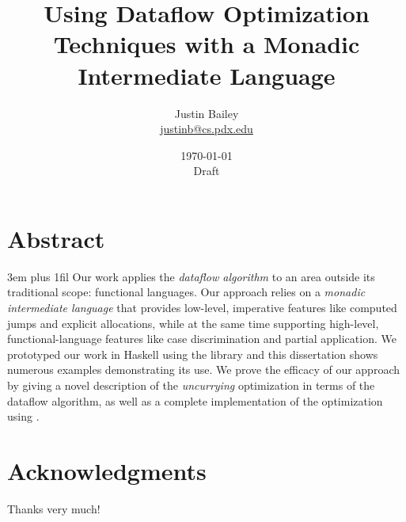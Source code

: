 \dodocclass



\date{\today \\Draft}
\author{Justin Bailey \\ \url{justinb@cs.pdx.edu}}
\title{Using Dataflow Optimization Techniques with a Monadic Intermediate Language}
\maketitle 

\pagestyle{plain}
\section*{Abstract}
{%
\parfillskip 3em plus 1fil%
Our work applies the \emph{dataflow algorithm} to an area outside its
traditional scope: functional languages. Our approach relies on
a \emph{monadic intermediate language} that provides low-level,
imperative features like computed jumps and explicit allocations,
while at the same time supporting high-level, functional-language
features like case discrimination and partial application. We
prototyped our work in Haskell using the \hoopl library and this
dissertation shows numerous examples demonstrating its use. We prove
the efficacy of our approach by giving a novel description of
the \emph{uncurrying} optimization in terms of the dataflow algorithm, as
well as a complete implementation of the optimization using \hoopl.\par}
\newpage

\section*{Acknowledgments}
Thanks very much!
\newpage

\singlespacing
\tableofcontents
\newpage
{}
\listoffigures
\newpage

